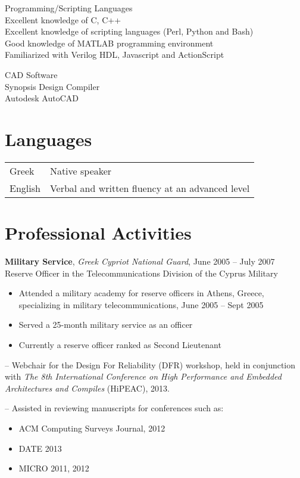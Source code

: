 \documentclass[11pt]{myres} %
\begin{document}
\begin{resume}
{\color{blue}Programming/Scripting Languages}\\
Excellent knowledge of C, C++\\
Excellent knowledge of scripting languages (Perl, Python and Bash)\\
Good knowledge of MATLAB programming environment\\
Familiarized with Verilog HDL, Javascript and ActionScript

{\color{blue}CAD Software}\\
Synopsis Design Compiler\\
Autodesk AutoCAD

\section{Languages}
\begin{tabular}{ll}
\color{blue}Greek & Native speaker \\[5pt]
\color{blue}English & Verbal and written fluency at an advanced level \\
\end{tabular}

\section{Professional Activities}

\textbf{Military Service}, \emph{Greek Cypriot National Guard}, June 2005 -- July 2007\\
Reserve Officer in the Telecommunications Division of the Cyprus Military\\
\begin{itemize}
	\item Attended a military academy for reserve officers in Athens, Greece, specializing in military telecommunications, June 2005 -- Sept 2005
	\item Served a 25-month military service as an officer
	\item Currently a reserve officer ranked as Second Lieutenant
\end{itemize}

-- Webchair for the Design For Reliability (DFR) workshop, held in conjunction with \emph{The 8th International Conference on High Performance and Embedded Architectures and Compiles} (HiPEAC), 2013.

-- Assisted in reviewing manuscripts for conferences such as:
\begin{itemize}
	\item ACM Computing Surveys Journal, 2012
	\item DATE 2013
	\item MICRO 2011, 2012
\end{itemize}


\end{resume}
\end{document}

